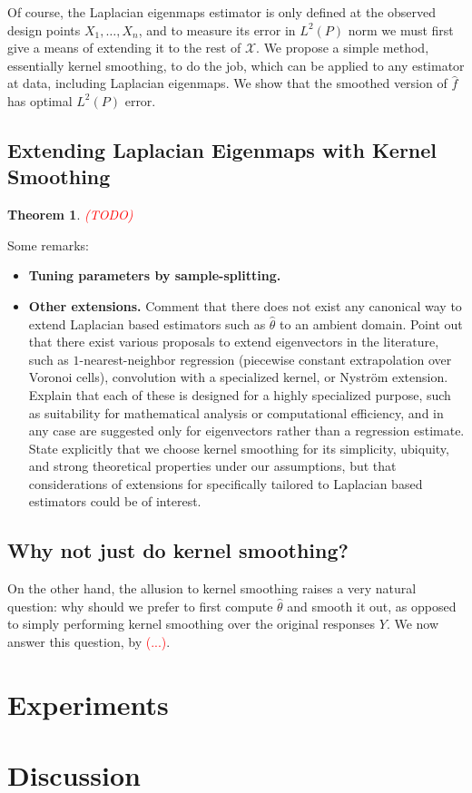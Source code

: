 \documentclass{article}
\newcommand{\1}{\mathbf{1}}
\newcommand{\Xset}{\mathcal{X}}
\newcommand{\wh}[1]{\widehat{#1}}
\theoremstyle{alden}
\theoremstyle{aldenthm}
\newtheorem{theorem}{Theorem}
\theoremstyle{definition}
\theoremstyle{remark}
\begin{document}
Of course, the Laplacian eigenmaps estimator is only defined at the observed design points $X_1,\ldots,X_n$, and to measure its error in $L^2(P)$ norm we must first give a means of extending it to the rest of $\Xset$. We propose a simple method, essentially kernel smoothing, to do the job, which can be applied to any estimator at data, including Laplacian eigenmaps. We show that the smoothed version of $\wh{f}$ has optimal $L^2(P)$ error. 

\subsection{Extending Laplacian Eigenmaps with Kernel Smoothing}

\begin{theorem}
	\label{thm:kernel_smoothing}
	\textcolor{red}{(TODO)}
\end{theorem}

Some remarks:
\begin{itemize}
	\item \textbf{Tuning parameters by sample-splitting.}
	\item \textbf{Other extensions.} Comment that there does not exist any canonical way to extend Laplacian based estimators such as $\wh{\theta}$ to an ambient domain. Point out that there exist various proposals to extend eigenvectors in the literature, such as $1$-nearest-neighbor regression (piecewise constant extrapolation over Voronoi cells), convolution with a specialized kernel, or Nystr\"{o}m extension. Explain that each of these is designed for a highly specialized purpose, such as suitability for mathematical analysis or computational efficiency, and in any case are suggested only for eigenvectors rather than a regression estimate. State explicitly that we choose kernel smoothing for its simplicity, ubiquity, and strong theoretical properties under our assumptions, but that considerations of extensions for specifically tailored to Laplacian based estimators could be of interest.
\end{itemize}


\subsection{Why not just do kernel smoothing?}
On the other hand, the allusion to kernel smoothing raises a very natural question: why should we prefer to first compute $\wh{\theta}$ and smooth it out, as opposed to simply performing kernel smoothing over the original responses $Y$. We now answer this question, by \textcolor{red}{(...)}.

\section{Experiments}
\label{sec:experiments}

\section{Discussion}
\label{sec:discussion}



 
\end{document}
